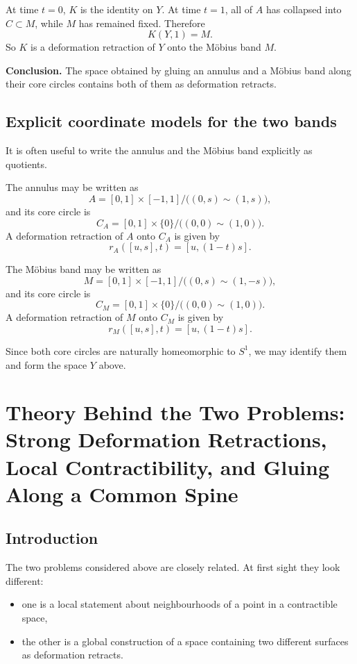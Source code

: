 \documentclass[12pt,a4paper]{article}
\theoremstyle{notespace}
\begin{document}
At time \(t=0\), \(K\) is the identity on \(Y\). At time \(t=1\), all of \(A\) has collapsed into \(C\subset M\), while \(M\) has remained fixed. Therefore
\[
K(Y,1)=M.
\]
So \(K\) is a deformation retraction of \(Y\) onto the Möbius band \(M\).

\medskip

\textbf{Conclusion.}
The space obtained by gluing an annulus and a Möbius band along their core circles contains both of them as deformation retracts.

\subsection{Explicit coordinate models for the two bands}

It is often useful to write the annulus and the Möbius band explicitly as quotients.

The annulus may be written as
\[
A=[0,1]\times [-1,1]\big/\bigl((0,s)\sim (1,s)\bigr),
\]
and its core circle is
\[
C_A=[0,1]\times \{0\}\big/\bigl((0,0)\sim (1,0)\bigr).
\]
A deformation retraction of \(A\) onto \(C_A\) is given by
\[
r_A([u,s],t)=[u,(1-t)s].
\]

The Möbius band may be written as
\[
M=[0,1]\times [-1,1]\big/\bigl((0,s)\sim (1,-s)\bigr),
\]
and its core circle is
\[
C_M=[0,1]\times \{0\}\big/\bigl((0,0)\sim (1,0)\bigr).
\]
A deformation retraction of \(M\) onto \(C_M\) is given by
\[
r_M([u,s],t)=[u,(1-t)s].
\]

Since both core circles are naturally homeomorphic to \(S^1\), we may identify them and form the space \(Y\) above.	

\section{Theory Behind the Two Problems: Strong Deformation Retractions, Local Contractibility, and Gluing Along a Common Spine}

\subsection{Introduction}

The two problems considered above are closely related. At first sight they look different:

\begin{itemize}
	\item one is a local statement about neighbourhoods of a point in a contractible space,
	\item the other is a global construction of a space containing two different surfaces as deformation retracts.
\end{itemize}
\end{document}
